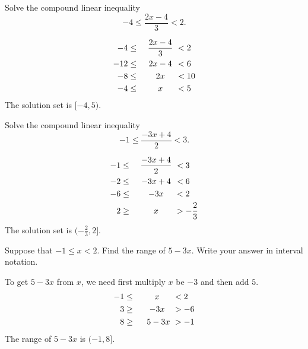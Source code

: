 	\begin{multicols}{2}
		\begin{example}Solve the compound linear inequality
			\[
			-4\leq\dfrac{2x-4}{3}<2.
			\]
		\end{example}
		\begin{solution}
				\begin{alignat*}{2}
					-4\leq  &  & \centermath{ \frac{2x-4}{3} } & <2  \\
					-12\leq &  & \centermath{ 2x-4 }           & <6  \\
					-8\leq  &  & \centermath{ 2x }             & <10 \\
					-4\leq  &  & \centermath{ x }              & <5  
				\end{alignat*}
			The solution set is $[-4, 5)$.
		\end{solution}

		\columnbreak


		\begin{example}
			Solve the compound linear inequality
			\[
			-1\leq \dfrac{-3x+4}{2}<3.
			\]
		\end{example}
		\begin{solution}
				\begin{alignat*}{2}
					-1\leq &  & \centermath{ \frac{-3x+4}{2} } & <3        \\
					-2\leq &  & \centermath{ -3x+4 }           & <6        \\
					-6\leq &  & \centermath{ -3x }             & <2        \\
					2\geq  &  & \centermath{  x }              & >-\frac23
				\end{alignat*}
			The solution set is $(-\frac23, 2]$.
		\end{solution}

	\end{multicols}


\begin{example}
Suppose that $-1\le x < 2$. Find the range of $5-3x$. Write your answer in interval notation.
\end{example}

\begin{solution}
	To get $5-3x$ from $x$, we need first multiply $x$ be $-3$ and then add $5$.
	\begin{alignat*}{2}
		-1\leq &  & \centermath{ x } & < 2        \\
		3\geq &  & \centermath{ -3x }           & >-6        \\
		8\geq &  & \centermath{~ 5-3x }             & >-1
	\end{alignat*}
	The range of $5-3x$ is $(-1, 8]$.
\end{solution}

